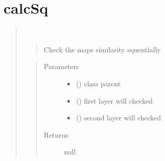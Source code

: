 \documentclass[letterpaper,10pt,english]{sphinxmanual}
\begin{document}
\section{calcSq}
\label{\detokenize{similarity_method:calcsq}}\begin{quote}

\begin{fulllineitems}
\label{\detokenize{similarity_method:calcSq}}~\begin{quote}

Check the maps similarity squentially
\end{quote}
\begin{quote}\begin{description}
\item[{Parameters}] \leavevmode\begin{itemize}
\item {} 
 () \textendash{} class parent

\item {} 
 () \textendash{} first layer will checked

\item {} 
 () \textendash{} second layer will checked

\end{itemize}

\item[{Returns}] \leavevmode
null

\end{description}\end{quote}

\end{fulllineitems}

\end{quote}
\end{document}
